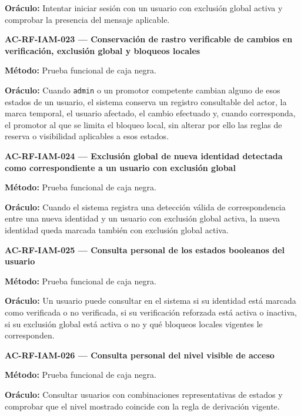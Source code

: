 \documentclass[10pt,letterpaper]{article}
\begin{document}
\textbf{Oráculo:} Intentar iniciar sesión con un usuario con exclusión global activa y comprobar la presencia del mensaje aplicable.\par\vspace{0.45em}
\noindent\textbf{AC-RF-IAM-023 --- Conservación de rastro verificable de cambios en verificación, exclusión global y bloqueos locales}\par
\textbf{Método:} Prueba funcional de caja negra.\par
\textbf{Oráculo:} Cuando \texttt{admin} o un promotor competente cambian alguno de esos estados de un usuario, el sistema conserva un registro consultable del actor, la marca temporal, el usuario afectado, el cambio efectuado y, cuando corresponda, el promotor al que se limita el bloqueo local, sin alterar por ello las reglas de reserva o visibilidad aplicables a esos estados.\par\vspace{0.45em}
\noindent\textbf{AC-RF-IAM-024 --- Exclusión global de nueva identidad detectada como correspondiente a un usuario con exclusión global}\par
\textbf{Método:} Prueba funcional de caja negra.\par
\textbf{Oráculo:} Cuando el sistema registra una detección válida de correspondencia entre una nueva identidad y un usuario con exclusión global activa, la nueva identidad queda marcada también con exclusión global activa.\par\vspace{0.45em}
\noindent\textbf{AC-RF-IAM-025 --- Consulta personal de los estados booleanos del usuario}\par
\textbf{Método:} Prueba funcional de caja negra.\par
\textbf{Oráculo:} Un usuario puede consultar en el sistema si su identidad está marcada como verificada o no verificada, si su verificación reforzada está activa o inactiva, si su exclusión global está activa o no y qué bloqueos locales vigentes le corresponden.\par\vspace{0.45em}
\noindent\textbf{AC-RF-IAM-026 --- Consulta personal del nivel visible de acceso}\par
\textbf{Método:} Prueba funcional de caja negra.\par
\textbf{Oráculo:} Consultar usuarios con combinaciones representativas de estados y comprobar que el nivel mostrado coincide con la regla de derivación vigente.\par\vspace{0.45em}
\end{document}
